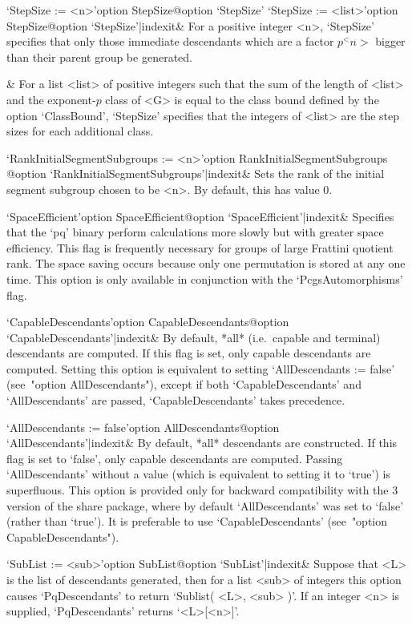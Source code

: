 \>`StepSize := <n>'{option StepSize}@{option `StepSize'}
\>`StepSize := <list>'{option StepSize}@{option `StepSize'|indexit}&
For  a  positive  integer  <n>,  `StepSize'  specifies  that  only  those
immediate descendants which are a factor $p^<n>$ bigger than their parent
group be generated.

&
For a list <list> of positive integers such that the sum of the length of
<list> and the exponent-$p$ class of <G> is  equal  to  the  class  bound
defined  by  the  option  `ClassBound',  `StepSize'  specifies  that  the
integers of <list> are the step sizes for each additional class.

\>`RankInitialSegmentSubgroups := <n>'{option RankInitialSegmentSubgroups}%
@{option `RankInitialSegmentSubgroups'|indexit}&
Sets the rank of the initial  segment  subgroup  chosen  to  be  <n>.  By
default, this has value 0.

\>`SpaceEfficient'{option SpaceEfficient}@{option `SpaceEfficient'|indexit}&
Specifies that the `pq' binary perform calculations more slowly but  with
greater space efficiency. This flag is frequently necessary for groups of
large Frattini quotient rank. The space saving occurs  because  only  one
permutation is stored at any one time. This option is only  available  in
conjunction with the `PcgsAutomorphisms' flag.

\>`CapableDescendants'{option CapableDescendants}@{option `CapableDescendants'|indexit}&
By default, *all* (i.e.~capable and terminal) descendants  are  computed.
If this flag is set, only capable descendants are computed. Setting  this
option is equivalent to setting `AllDescendants  :=  false'  (see~"option
AllDescendants"),    except    if    both    `CapableDescendants'     and
`AllDescendants' are passed, `CapableDescendants' takes precedence.

\>`AllDescendants := false'{option AllDescendants}@{option `AllDescendants'|indexit}&
By default, *all* descendants are constructed. If this  flag  is  set  to
`false', only capable descendants are computed. Passing  `AllDescendants'
without a value  (which  is  equivalent  to  setting  it  to  `true')  is
superfluous. This option is provided only for backward compatibility with
the {\GAP} 3 version of the {\ANUPQ}  share  package,  where  by  default
`AllDescendants'  was  set  to  `false'  (rather  than  `true').  It   is
preferable to use `CapableDescendants' (see~"option CapableDescendants").

\>`SubList := <sub>'{option SubList}@{option `SubList'|indexit}&
Suppose that <L> is the list of descendants generated, then  for  a  list
<sub> of integers this option causes `PqDescendants' to return  `Sublist(
<L>, <sub> )'. If an integer <n>  is  supplied,  `PqDescendants'  returns
`<L>[<n>]'.

